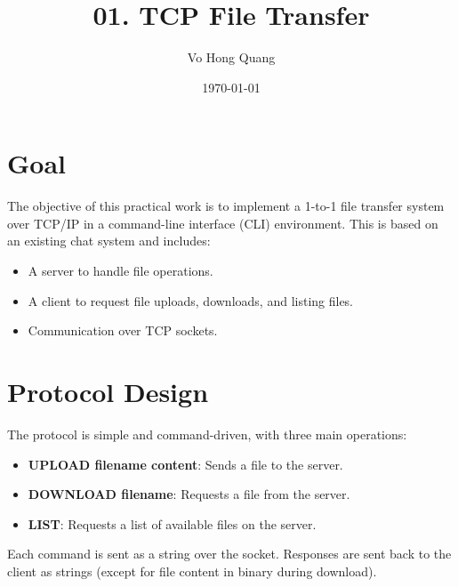 \documentclass[a4paper,12pt]{article}
\title{01. TCP File Transfer}
\author{Vo Hong Quang}
\date{\today}
\begin{document}
\maketitle

\section*{Goal}
The objective of this practical work is to implement a 1-to-1 file transfer system over TCP/IP in a command-line interface (CLI) environment. This is based on an existing chat system and includes:
\begin{itemize}
    \item A server to handle file operations.
    \item A client to request file uploads, downloads, and listing files.
    \item Communication over TCP sockets.
\end{itemize}

\section*{Protocol Design}
The protocol is simple and command-driven, with three main operations:
\begin{itemize}
    \item \textbf{UPLOAD filename content}: Sends a file to the server.
    \item \textbf{DOWNLOAD filename}: Requests a file from the server.
    \item \textbf{LIST}: Requests a list of available files on the server.
\end{itemize}

Each command is sent as a string over the socket. Responses are sent back to the client as strings (except for file content in binary during download).
\end{document}
